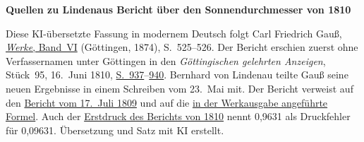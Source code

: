 \clearpage\thispagestyle{empty}
\begin{center}\textbf{Quellen zu Lindenaus Bericht über den Sonnendurchmesser von 1810}\end{center}
\noindent Diese KI-übersetzte Fassung in modernem Deutsch folgt Carl Friedrich Gauß, \href{https://gdz.sub.uni-goettingen.de/id/PPN236007467}{\emph{Werke}, Band~VI} (Göttingen, 1874), S.~525–526. Der Bericht erschien zuerst ohne Verfassernamen unter Göttingen in den \emph{Göttingischen gelehrten Anzeigen}, Stück~95, 16.~Juni 1810, \href{https://images.p.sub.uni-goettingen.de/iiif/image/gdz:PPN319721507_1810:00000969/full/1650,/0/default.jpg}{S.~937}–\href{https://images.p.sub.uni-goettingen.de/iiif/image/gdz:PPN319721507_1810:00000972/full/1650,/0/default.jpg}{940}. Bernhard von Lindenau teilte Gauß seine neuen Ergebnisse in einem Schreiben vom 23.~Mai mit. Der Bericht verweist auf den \hyperlink{native-524-lower}{Bericht vom 17.~Juli 1809} und auf die \hyperlink{native-518}{in der Werkausgabe angeführte Formel}. Auch der \href{https://images.p.sub.uni-goettingen.de/iiif/image/gdz:PPN319721507_1810:00000970/full/1650,/0/default.jpg}{Erstdruck des Berichts von 1810} nennt 0,9631 als Druckfehler für 0,09631. Übersetzung und Satz mit KI erstellt.
\clearpage
